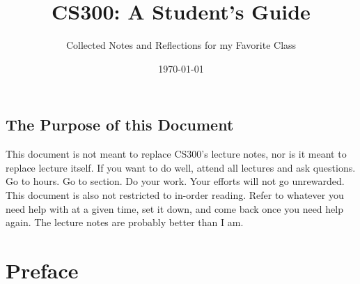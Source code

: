 \documentclass[a4paper, 12pt]{article}
\institute{Brown University}
\title{CS300: A Student's Guide}
\subtitle{Collected Notes and Reflections for my Favorite Class}
\date{\today}
\begin{document}
\maketitle

\begin{center}


	\vfill
	\section*{The Purpose of this Document}

	This document is not meant to replace CS300's lecture notes, nor is it meant to replace lecture itself.
	If you want to do well, attend all lectures and ask questions. Go to hours. Go to section. Do your work. Your efforts will not go unrewarded.
	This document is also not restricted to in-order reading. Refer to whatever you need help with at a given time, set it down, and come back once you need help again.
	The lecture notes are probably better than I am.

	\vfill

	\clearpage

\end{center}

\section*{Preface}
\end{document}

